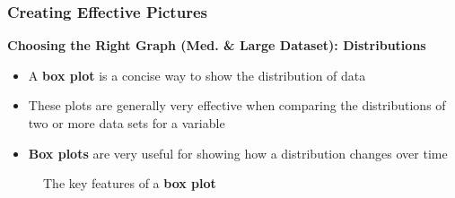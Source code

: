 \documentclass{beamer}
\begin{document}
\begin{frame}
\frametitle{Creating Effective Pictures}
\textbf{Choosing the Right Graph (Med. \& Large Dataset): Distributions}\\
\vspace{0.2cm}
\begin{itemize}
\item A \textbf{box plot} is a concise way to show the distribution of data
\vspace{0.1cm}
\item These plots are generally very effective when comparing the distributions of two or more data sets for a variable
\vspace{0.1cm}
\item \textbf{Box plots} are very useful for showing how a distribution changes over time
\end{itemize}
\vspace{-0.1cm}
\begin{figure}
\caption{The key features of a \textbf{box plot}}
\end{figure}
\end{frame}

\end{document}
